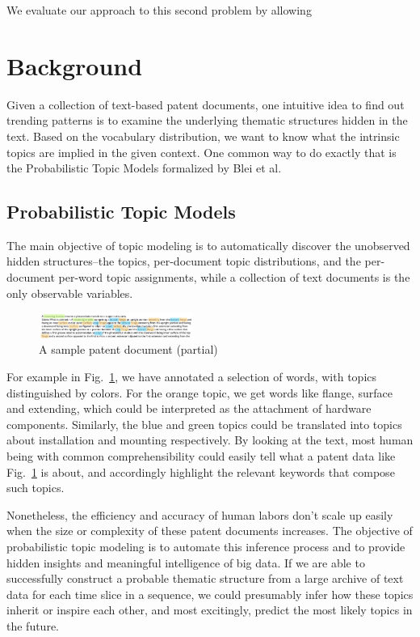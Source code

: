 \documentclass[conference]{IEEEtran}
\begin{document}
We evaluate our approach to this second problem by allowing


\section{Background}

Given a collection of text-based patent documents, one intuitive idea to find out trending patterns is to examine the underlying thematic structures hidden in the text. Based on the vocabulary distribution, we want to know what the intrinsic topics are implied in the given context. One common way to do exactly that is the Probabilistic Topic Models formalized by  Blei et al. \cite{blei2011}

\subsection{Probabilistic Topic Models}

The main objective of topic modeling is to automatically discover the unobserved hidden structures--the topics, per-document topic distributions, and the per-document per-word topic assignments, while a collection of text documents is the only observable variables. 

\begin{figure}[h]
	\center	
	\includegraphics[width=0.45\textwidth]{fig/pat007.png}
	\caption{A sample patent document (partial)}
	\label{sample_patent}
\end{figure}

For example in Fig.~\ref{sample_patent}, we have annotated a selection of words, with topics distinguished by colors. For the orange topic, we get words like flange, surface and extending, which could be interpreted as the attachment of hardware components. Similarly, the blue and green topics could be translated into topics about installation and mounting respectively. By looking at the text, most human being with common comprehensibility could easily tell what a patent data like Fig.~\ref{sample_patent} is about, and accordingly highlight the relevant keywords that compose such topics. 

Nonetheless, the efficiency and accuracy of human labors don't scale up easily when the size or complexity of these patent documents increases. The objective of probabilistic topic modeling is to automate this inference process and to provide hidden insights and meaningful intelligence of big data. If we are able to successfully construct a probable thematic structure from a large archive of text data for each time slice in a sequence, we could presumably infer how these topics inherit or inspire each other, and most excitingly, predict the most likely topics in the future.
\end{document}

